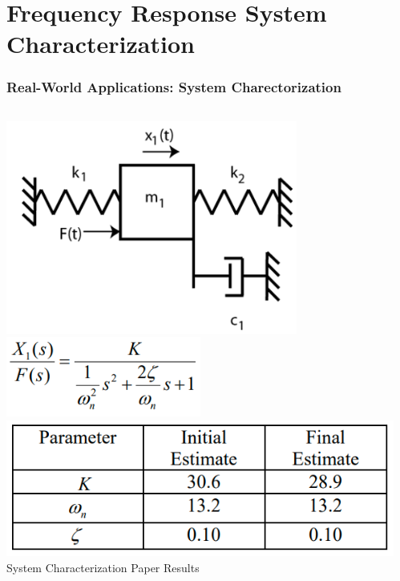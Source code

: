 \documentclass[aspectratio=169]{beamer}
\begin{document}
\section{Frequency Response System Characterization}
\begin{frame}
	\frametitle{Real-World Applications: System Charectorization}
	\begin{columns}
		\begin{column}{0.375\textwidth}
			\centering
			\includegraphics[width=0.75\textwidth]{Images/sys_char_diagram.png}\\
			\includegraphics[width=0.5\textwidth]{Images/sys_char_tf.png}\\
			\includegraphics[width=\textwidth]{Images/sys_char_results.png}\\
			\footnotesize{System Characterization Paper Results 
			\cite{freq_response_charectorization}}
		\end{column}
		\begin{column}{0.5\textwidth}

\end{column}
\end{columns}
\end{frame}
\end{document}
